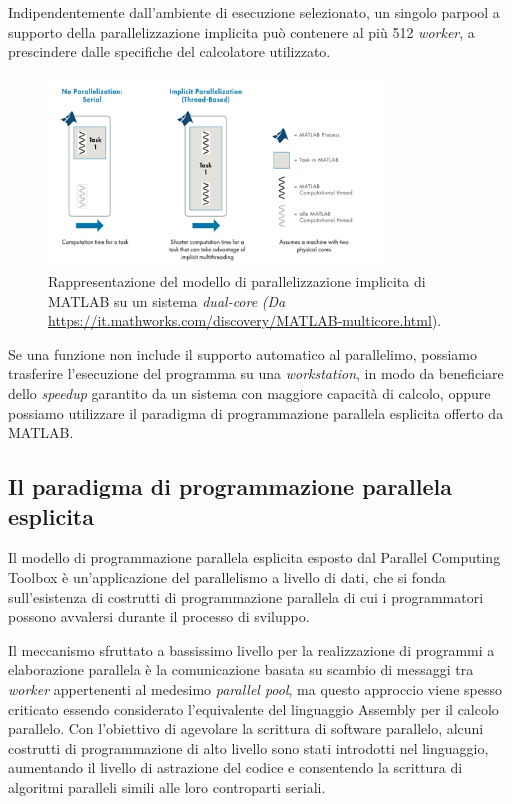 Indipendentemente dall'ambiente di esecuzione selezionato, un singolo parpool a supporto della parallelizzazione implicita pu\`o contenere al pi\`u 512 \textit{worker}, a prescindere dalle specifiche
del calcolatore utilizzato.
\begin{figure}[htbp]
    \centering
    \includegraphics[width=0.8\textwidth]{../Risorse/Capitolo 2/ImplicitParallelization.png}
    \caption{Rappresentazione del modello di parallelizzazione implicita di MATLAB su un sistema \textit{dual-core}
        \small{\textit{(Da} \url{https://it.mathworks.com/discovery/MATLAB-multicore.html})}.}
    \label{fig:parallelismoImplicito}
\end{figure}\newline
Se una funzione non include il supporto automatico al parallelimo, possiamo trasferire l'esecuzione del programma su una \textit{workstation}, in modo da beneficiare
dello \textit{speedup} garantito da un sistema con maggiore capacit\`a di calcolo, oppure possiamo utilizzare il paradigma di programmazione parallela esplicita offerto
da MATLAB.

\subsection{Il paradigma di programmazione parallela esplicita}

Il modello di programmazione parallela esplicita esposto dal Parallel Computing Toolbox \`e un'applicazione del parallelismo a livello di dati, che si fonda sull'esistenza di costrutti di programmazione
parallela di cui i programmatori possono avvalersi durante il processo di sviluppo.

Il meccanismo sfruttato a bassissimo livello per la realizzazione di programmi a elaborazione parallela \`e la comunicazione basata su scambio di messaggi tra \textit{worker}
appertenenti al medesimo \textit{parallel pool}, ma questo approccio viene spesso criticato essendo considerato l'equivalente del linguaggio
Assembly per il calcolo parallelo.\newline
Con l'obiettivo di agevolare la scrittura di software parallelo, alcuni costrutti di programmazione di alto livello sono stati introdotti nel linguaggio, aumentando il livello di
astrazione del codice e consentendo la scrittura di algoritmi paralleli simili alle loro controparti seriali.

